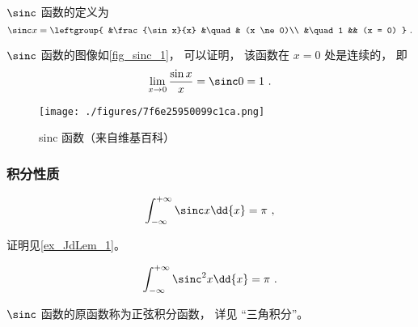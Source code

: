 

$\sinc$ 函数的定义为
\begin{equation}
\sinc x = 
\leftgroup{
&\frac{\sin x}{x} &\quad & (x \ne 0)\\
&\quad 1 && (x = 0)
}~.\end{equation}

$\sinc$ 函数的图像如\autoref{fig_sinc_1}， 可以证明， 该函数在 $x=0$ 处是连续的， 即
\begin{equation}
\lim_{x \to 0}\frac{\sin x}{x} = \sinc 0 = 1~.
\end{equation}

\begin{figure}[ht]
\centering
\texttt{[image: ./figures/7f6e25950099c1ca.png]}
\caption{sinc 函数（来自维基百科）} \label{fig_sinc_1}
\end{figure}

\subsubsection{积分性质}
\begin{equation}\label{eq_sinc_2}
\int_{-\infty}^{+\infty} \sinc x \dd{x} = \pi~,
\end{equation}

证明见\autoref{ex_JdLem_1}。

\begin{equation}\label{eq_sinc_1}
\int_{-\infty}^{+\infty} \sinc^2 x \dd{x} = \pi~.
\end{equation}

$\sinc$ 函数的原函数称为正弦积分函数， 详见 “三角积分”。
